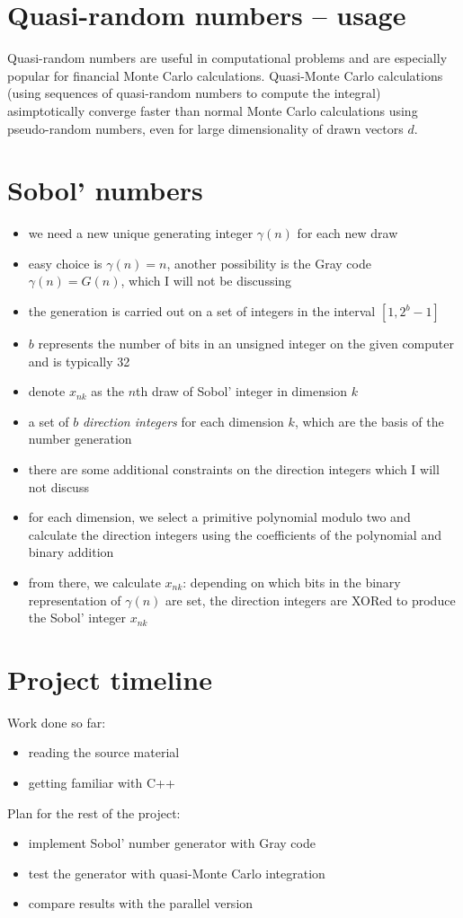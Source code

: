 \documentclass[11pt]{article}
\begin{document}
\section{Quasi-random numbers -- usage}
Quasi-random numbers are useful in computational problems and are especially popular for financial Monte Carlo calculations. Quasi-Monte Carlo calculations (using sequences of quasi-random numbers to compute the integral) asimptotically converge faster than normal Monte Carlo calculations using pseudo-random numbers, even for large dimensionality of drawn vectors $d$.

\section{Sobol' numbers}
\begin{itemize}
    \item we need a new unique generating integer $\gamma(n)$ for each new draw \item easy choice is $\gamma (n) = n$, another possibility is the Gray code $\gamma (n) = G(n)$, which I will not be discussing
    \item the generation is carried out on a set of integers in the interval $[1, 2^b-1]$
    \item $b$ represents the number of bits in an unsigned integer on the given computer and is typically 32
    \item denote $x_{nk}$ as the $n$th draw of Sobol' integer in dimension $k$
    \item a set of $b$ \emph{direction integers} for each dimension $k$, which are the basis of the number generation
    \item there are some additional constraints on the direction integers which I will not discuss
    \item for each dimension, we select a primitive polynomial modulo two and calculate the direction integers using the coefficients of the polynomial and binary addition
    \item from there, we calculate $x_{nk}$: depending on which bits in the binary representation of $\gamma(n)$ are set, the direction integers are XORed to produce the Sobol' integer $x_{nk}$
\end{itemize}

\section{Project timeline}
    Work done so far:
    \begin{itemize}
        \item reading the source material
        \item getting familiar with C++
    \end{itemize}
    
    Plan for the rest of the project: 
    \begin{itemize}
        \item implement Sobol' number generator with Gray code
        \item test the generator with quasi-Monte Carlo integration
        \item compare results with the parallel version
    \end{itemize}
\end{document}
